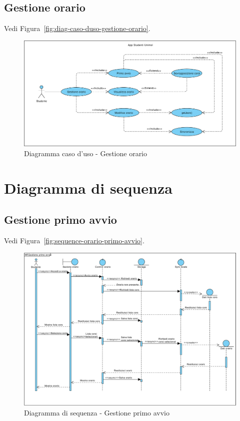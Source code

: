 \subsection{Gestione orario} %

Vedi Figura~\vref{fig:diag-caso-duso-gestione-orario}.

\begin{figure}
	\centering
	\includegraphics[width=\textwidth]{imgs/gruppo2/usecase-diagram-orario.pdf}
	\caption{Diagramma caso d'uso - Gestione orario}
	\label{fig:diag-caso-duso-gestione-orario}
\end{figure}


\section{Diagramma di sequenza}

\subsection{Gestione primo avvio} %

Vedi Figura~\vref{fig:sequence-orario-primo-avvio}.

\begin{figure}
	\centering
	\includegraphics[width=\textwidth]{imgs/gruppo2/sequence-orario-primo-avvio.pdf}
	\caption{Diagramma di sequenza - Gestione primo avvio}
	\label{fig:sequence-orario-primo-avvio}
\end{figure}

